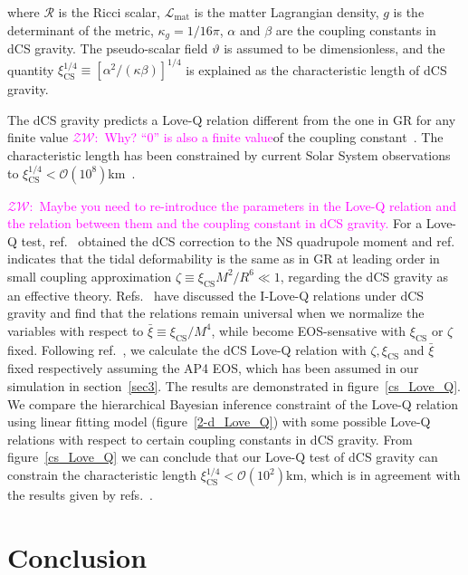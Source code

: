 \documentclass[a4paper,11pt]{article}
\newcommand{\ZW}[1]{\textcolor{magenta}{$\mathcal{ZW}$:~#1}}
\begin{document}
where $\mathcal{R}$ is the Ricci scalar, $\mathcal{L}_{\mathrm{mat}}$ is the matter Lagrangian density, $g$ is the determinant of the metric, $\kappa_g= 1/16\pi$, $\alpha$ and $\beta$ 
are the coupling constants in dCS gravity. The pseudo-scalar field
$\mathcal{\vartheta}$ is assumed to be dimensionless, and the quantity
$\xi_{\mathrm{CS}}^{1/4} \equiv [\alpha^2/(\kappa\beta)]^{1/4}$ is explained as the characteristic length of dCS gravity. 

The dCS
gravity predicts a Love-Q relation different from the one in GR for any finite
value \ZW{Why? ``0'' is also a finite
value}of the coupling constant~\cite{Yagi:2013bca, Yagi:2013awa, Gupta:2017vsl}.
The characteristic length has been constrained by current Solar System
observations to $\xi_{\mathrm{CS}}^{1/4}<
\mathcal{O}(10^8)$km~\cite{Ali-Haimoud:2011zme, Yagi:2012ya}.

\ZW{Maybe you need to re-introduce the parameters in the Love-Q relation and the
relation between them and the coupling constant in dCS gravity.}
For a Love-Q test, ref.~\cite{Yagi:2013mbt} obtained the dCS correction to the NS quadrupole moment and ref.~\cite{Yagi:2011xp} indicates that the tidal deformability is the same as in GR at leading order in small coupling approximation $\zeta \equiv \xi_{\mathrm{CS}} M^2/R^6 \ll 1$, regarding the dCS gravity as an effective theory. Refs.~\cite{Yagi_2017, Yagi:2013mbt} have discussed the I-Love-Q relations under dCS gravity and find that the relations remain universal when we normalize the variables with respect to $\bar{\xi}\equiv \xi_{\mathrm{CS}}/M^4$, while become EOS-sensative with $\xi_{\mathrm{CS}}$ or $\zeta$ fixed. 
Following ref.~\cite{Yagi_2017}, we calculate the dCS Love-Q relation with $\zeta, \xi_{\mathrm{CS}}$ and $\bar{\xi}$ fixed respectively assuming the AP4 EOS, which has been assumed in our simulation in section~\ref{sec3}. The results are demonstrated in figure~\ref{cs_Love_Q}. We compare the hierarchical Bayesian inference constraint of the Love-Q relation using linear fitting model (figure~\ref{2-d_Love_Q}) with some possible Love-Q relations with respect to certain coupling constants in dCS gravity. From figure~\ref{cs_Love_Q} we can conclude that our Love-Q test of dCS gravity can constrain the characteristic length $\xi_{\mathrm{CS}}^{1/4} < \mathcal{O}(10^2)$km, which is in agreement  
with the results given by refs.~\cite{Yagi:2013bca, Yagi:2013awa}.

\section{Conclusion}
\label{sec6}
\end{document}
